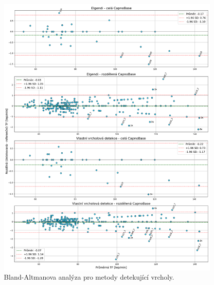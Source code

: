 \begin{figure}[!ht]
	\centering
	\includegraphics[width=1\textwidth]{./obrazky/vysledky/BlandAltman_CB_peaks.png}
	\caption[Bland-Altmanova analýza pro metody detekující vrcholy - CapnoBase]{Bland-Altmanova analýza pro metody detekující vrcholy.}
	\label{fig:capnobase_BlandAltman_peaks}
\end{figure}

